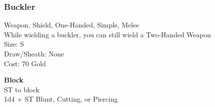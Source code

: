 \subsubsection{Buckler}\label{weapon:buckler}
Weapon, Shield, One-Handed, Simple, Melee\\
While wielding a buckler, you can still wield a Two-Handed Weapon\\
Size: S\\
Draw/Sheath: None\\
Cost: 70 Gold

\textbf{Block}\\
ST to block\\
1d4 + \texttimes ST Blunt, Cutting, or Piercing

